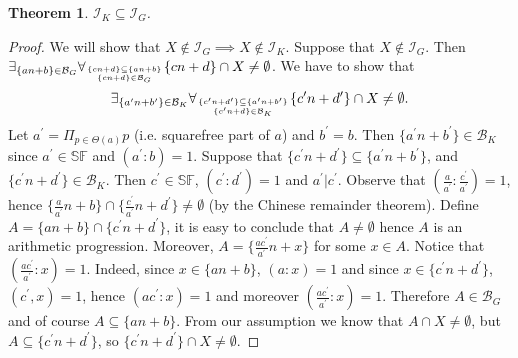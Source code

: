 \documentclass{amsart}
\newtheorem{thm}{Theorem}
\theoremstyle{definition}
\theoremstyle{definition}
\newcommand{\I}{\mathcal I}
\newcommand{\B}{\mathcal{B}}
\newcommand{\SqrFr}{\mathbb{SF}}
\begin{document}
\begin{thm}
$\I_K \subseteq \I_G$.
\end{thm}	   
\begin{proof}
We will show that $X \not\in \I_G \implies X \not\in \I_K$.
Suppose that $X \not\in \I_G$. Then
$\exists_{\{an+b\}\in \B_G} \forall_{\{cn+d\} \subseteq \{an+b\} \atop \{cn+d\}\in \B_G} \{cn+d\} \cap X \not= \emptyset$.
We have to show that 
$$\exists_{\{a^\prime n+b^\prime\}\in \B_K} \forall_{\{c^\prime n+d^\prime \} \subseteq \{a^\prime n+b^\prime\} \atop \{c^\prime n+d\}
\in \B_K} \{c^\prime n+d^\prime \} \cap X \not= \emptyset.$$
Let $a^\prime = \Pi_{p \in \Theta(a)} p$ (i.e. squarefree part of $a$)
and $b^\prime = b$. Then $\{a^\prime n+b^\prime\} \in \B_K$
since $a^\prime \in \SqrFr$ and $(a^\prime : b) = 1$.
Suppose that $\{c^\prime n+d^\prime \} \subseteq \{a^\prime n+b^\prime\}$,
and $\{c^\prime n+d^\prime\}\in \B_K$. Then $c^\prime \in \SqrFr$, $(c^\prime:d^\prime)=1$
and $a^\prime | c^\prime$. 
Observe that $(\frac{a}{a^\prime} : \frac{c^\prime}{a^\prime}) = 1$,
hence
$\{\frac{a}{a^\prime} n + b\} \cap \{\frac{c^\prime}{a^\prime} n + d^\prime \} \not= \emptyset$
(by the Chinese remainder theorem).
Define $A = \{a n+b \} \cap \{c^\prime n+d^\prime \}$, it is easy to 
conclude that $A \not= \emptyset$ hence $A$ is an arithmetic progression.
Moreover, $A = \{\frac{a c^\prime}{a^\prime} n + x\}$
for some $x \in A$.
Notice that $(\frac{a c^\prime}{a^\prime} : x) = 1$. Indeed, 
since $x \in \{a n+b \}$, $(a : x) = 1$ and since
$x \in \{c^\prime n+d^\prime \}$, $(c^\prime, x) = 1$,
hence $(a c^\prime : x) = 1$ and moreover
$(\frac{a c^\prime}{a^\prime} : x) = 1$.
Therefore $A \in \B_G$ and of course $A \subseteq \{a n+b \}$.
From our assumption we know that $A \cap X \not= \emptyset$,
but $A \subseteq \{c^\prime n+d^\prime \}$, 
so $\{c^\prime n+d^\prime \} \cap X \not= \emptyset$.
\end{proof}
\end{document}

